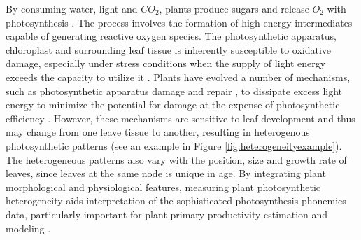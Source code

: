 \documentclass{bioinfo}
\begin{document}
By consuming water, light and $CO_2$, plants produce sugars and release $O_2$ with photosynthesis \citep{kramer2011importance}. The process involves the formation of high energy intermediates capable of generating reactive oxygen species. The photosynthetic apparatus, chloroplast and surrounding leaf tissue is inherently susceptible to oxidative damage, especially under stress conditions when the supply of light energy exceeds the capacity to utilize it \citep{durrant1990characterisation,asada1996radical}. Plants have evolved a number of mechanisms, such as photosynthetic apparatus damage and repair \citep{melis1999photosystem}, to dissipate excess light energy to minimize the potential for damage at the expense of photosynthetic efficiency \citep{adams2006energy,rochaix2014regulation}. However, these mechanisms are sensitive to leaf development and thus may change from one leave tissue to another, resulting in heterogenous photosynthetic patterns (see an example in Figure \ref{fig:heterogeneityexample}). The heterogeneous patterns also vary with the position, size and growth rate of leaves, since leaves at the same node is unique in age. By integrating plant morphological and physiological features, measuring plant photosynthetic heterogeneity aids interpretation of the sophisticated photosynthesis phonemics data, particularly important for plant primary productivity estimation and modeling \citep{meng2007spatial}.
\end{document}

